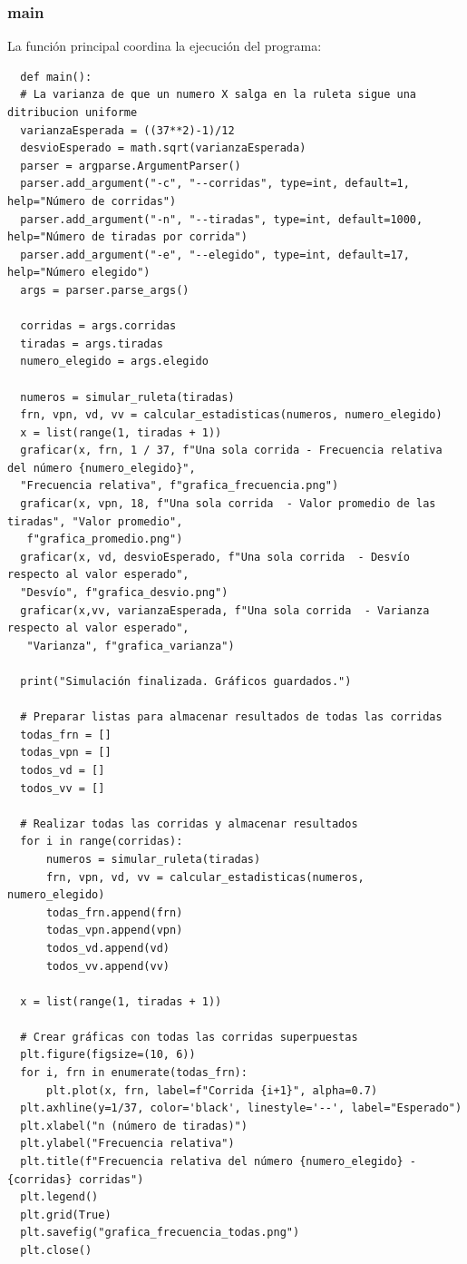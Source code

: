 \documentclass{article}
\begin{document}
\subsubsection{main}
La función principal coordina la ejecución del programa:

\begin{verbatim}
  def main():
  # La varianza de que un numero X salga en la ruleta sigue una ditribucion uniforme 
  varianzaEsperada = ((37**2)-1)/12
  desvioEsperado = math.sqrt(varianzaEsperada)
  parser = argparse.ArgumentParser()
  parser.add_argument("-c", "--corridas", type=int, default=1, help="Número de corridas")
  parser.add_argument("-n", "--tiradas", type=int, default=1000, help="Número de tiradas por corrida")
  parser.add_argument("-e", "--elegido", type=int, default=17, help="Número elegido")
  args = parser.parse_args()

  corridas = args.corridas
  tiradas = args.tiradas
  numero_elegido = args.elegido

  numeros = simular_ruleta(tiradas)
  frn, vpn, vd, vv = calcular_estadisticas(numeros, numero_elegido)
  x = list(range(1, tiradas + 1))
  graficar(x, frn, 1 / 37, f"Una sola corrida - Frecuencia relativa del número {numero_elegido}", 
  "Frecuencia relativa", f"grafica_frecuencia.png")
  graficar(x, vpn, 18, f"Una sola corrida  - Valor promedio de las tiradas", "Valor promedio",
   f"grafica_promedio.png")
  graficar(x, vd, desvioEsperado, f"Una sola corrida  - Desvío respecto al valor esperado",
  "Desvío", f"grafica_desvio.png")
  graficar(x,vv, varianzaEsperada, f"Una sola corrida  - Varianza respecto al valor esperado",
   "Varianza", f"grafica_varianza")

  print("Simulación finalizada. Gráficos guardados.")

  # Preparar listas para almacenar resultados de todas las corridas
  todas_frn = []
  todas_vpn = []
  todos_vd = []
  todos_vv = []
  
  # Realizar todas las corridas y almacenar resultados
  for i in range(corridas):
      numeros = simular_ruleta(tiradas)
      frn, vpn, vd, vv = calcular_estadisticas(numeros, numero_elegido)
      todas_frn.append(frn)
      todas_vpn.append(vpn)
      todos_vd.append(vd)
      todos_vv.append(vv)
  
  x = list(range(1, tiradas + 1))
  
  # Crear gráficas con todas las corridas superpuestas
  plt.figure(figsize=(10, 6))
  for i, frn in enumerate(todas_frn):
      plt.plot(x, frn, label=f"Corrida {i+1}", alpha=0.7)
  plt.axhline(y=1/37, color='black', linestyle='--', label="Esperado")
  plt.xlabel("n (número de tiradas)")
  plt.ylabel("Frecuencia relativa")
  plt.title(f"Frecuencia relativa del número {numero_elegido} - {corridas} corridas")
  plt.legend()
  plt.grid(True)
  plt.savefig("grafica_frecuencia_todas.png")
  plt.close()
  

\end{verbatim}
\end{document}
